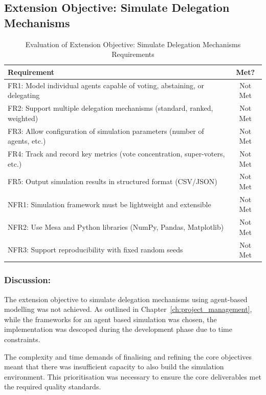 \subsection{Extension Objective: Simulate Delegation Mechanisms}

\begin{table}[H]
\centering
\begin{tabular}{|p{9cm}|c|}
\hline
\textbf{Requirement} & \textbf{Met?} \\ \hline
FR1: Model individual agents capable of voting, abstaining, or delegating & Not Met \\ \hline
FR2: Support multiple delegation mechanisms (standard, ranked, weighted) & Not Met \\ \hline
FR3: Allow configuration of simulation parameters (number of agents, etc.) & Not Met \\ \hline
FR4: Track and record key metrics (vote concentration, super-voters, etc.) & Not Met \\ \hline
FR5: Output simulation results in structured format (CSV/JSON) & Not Met \\ \hline
NFR1: Simulation framework must be lightweight and extensible & Not Met \\ \hline
NFR2: Use Mesa and Python libraries (NumPy, Pandas, Matplotlib) & Not Met \\ \hline
NFR3: Support reproducibility with fixed random seeds & Not Met \\ \hline
\end{tabular}
\caption{Evaluation of Extension Objective: Simulate Delegation Mechanisms Requirements}
\label{tab:objective5_requirements}
\end{table}

\subsubsection{Discussion:}

The extension objective to simulate delegation mechanisms using agent-based modelling was not achieved. As outlined in Chapter~\ref{ch:project_management}, while the frameworks for an agent based simulation was chosen, the implementation was descoped during the development phase due to time constraints.

The complexity and time demands of finalising and refining the core objectives meant that there was insufficient capacity to also build the simulation environment. This prioritisation was necessary to ensure the core deliverables met the required quality standards.

